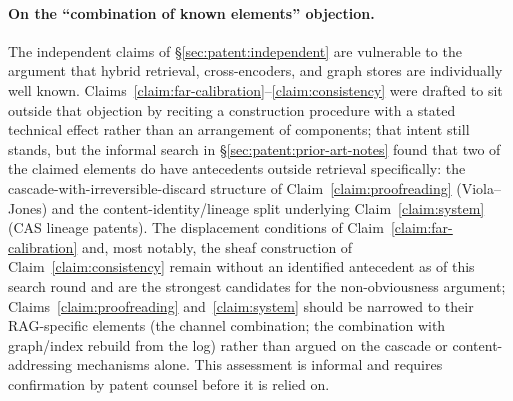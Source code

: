 \paragraph{On the ``combination of known elements'' objection.} The independent claims of \S\ref{sec:patent:independent} are vulnerable to the argument that hybrid retrieval, cross-encoders, and graph stores are individually well known. Claims~\ref{claim:far-calibration}--\ref{claim:consistency} were drafted to sit outside that objection by reciting a construction procedure with a stated technical effect rather than an arrangement of components; that intent still stands, but the informal search in \S\ref{sec:patent:prior-art-notes} found that two of the claimed elements do have antecedents outside retrieval specifically: the cascade-with-irreversible-discard structure of Claim~\ref{claim:proofreading} (Viola--Jones) and the content-identity/lineage split underlying Claim~\ref{claim:system} (CAS lineage patents). The displacement conditions of Claim~\ref{claim:far-calibration} and, most notably, the sheaf construction of Claim~\ref{claim:consistency} remain without an identified antecedent as of this search round and are the strongest candidates for the non-obviousness argument; Claims~\ref{claim:proofreading} and~\ref{claim:system} should be narrowed to their RAG-specific elements (the channel combination; the combination with graph/index rebuild from the log) rather than argued on the cascade or content-addressing mechanisms alone. This assessment is informal and requires confirmation by patent counsel before it is relied on.

